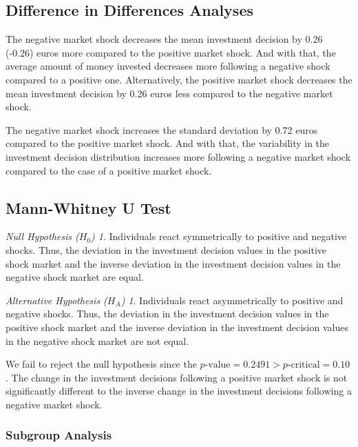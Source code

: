 \documentclass[12pt, a4paper]{article}
\theoremstyle{remark}
\newtheorem*{nullhypothesis}{Null Hypothesis ($H_0$)}
\newtheorem*{alternativehypothesis}{Alternative Hypothesis ($H_A$)}
\begin{document}
\subsection{Difference in Differences Analyses}

The negative market shock decreases the mean investment decision by 0.26 (-0.26) euros more compared to the positive market shock. And with that, the average amount of money invested decreases more following a negative shock compared to a positive one. Alternatively, the positive market shock decreases the mean investment decision by 0.26 euros less compared to the negative market shock.

The negative market shock increases the standard deviation by 0.72 euros compared to the positive market shock. And with that, the variability in the investment decision distribution increases more following a negative market shock compared to the case of a positive market shock.


\subsection{Mann-Whitney U Test}

\begin{nullhypothesis}
Individuals react symmetrically to positive and negative shocks. Thus, the deviation in the investment decision values in the positive shock market and the inverse deviation in the investment decision values in the negative shock market are equal.
\end{nullhypothesis}

\begin{alternativehypothesis}
Individuals react asymmetrically to positive and negative shocks. Thus, the deviation in the investment decision values in the positive shock market and the inverse deviation in the investment decision values in the negative shock market are not equal.
\end{alternativehypothesis}

We fail to reject the null hypothesis since the $p\text{-value} = 0.2491 > p\text{-critical} = 0.10$. The change in the investment decisions following a positive market shock is not significantly different to the inverse change in the investment decisions following a negative market shock.

\subsubsection{Subgroup Analysis}
\end{document}
